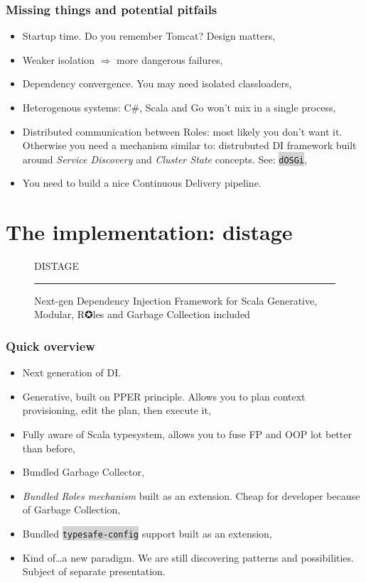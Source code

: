 \documentclass[usenames,dvipsnames]{beamer}
\newcommand{\code}[1]{\colorbox{lightgray}{\texttt{#1}}}
\begin{document}
\begin{frame}
\frametitle{Missing things and potential pitfails}
\begin{itemize}
\item Startup time. Do you remember Tomcat? Design matters\footnotemark[1],
\item Weaker isolation $\Rightarrow$ more dangerous failures,
\item Dependency convergence. You may need isolated classloaders\footnotemark[2],
\item Heterogenous systems: C\#, Scala and Go won't mix in a single process\footnotemark[3], 
\item Distributed communication between Roles: most likely you don't want it. Otherwise 
      you need a mechanism similar to: distrubuted DI framework 
      built around \textit{Service Discovery} and \textit{Cluster State} concepts. See: \code{dOSGi},
\item You need to build a nice Continuous Delivery pipeline.
\end{itemize}
\end{frame}

\section{The implementation: distage}

\begin{frame}
\begin{figure}
\Huge 
\color{RubineRed} DISTAGE
\noindent
{\color{RubineRed} \rule{\linewidth}{1mm} }
\Large Next-gen Dependency Injection Framework for Scala
\normalsize Generative, Modular, R✪les and Garbage Collection included 
\end{figure}
\end{frame}

\begin{frame}
\frametitle{Quick overview}
\begin{itemize}
\item Next generation of DI.
\item Generative, built on PPER principle. Allows you to plan context provisioning, edit the plan, then execute it,
\item Fully aware of Scala typesystem, allows you to fuse FP and OOP lot better than before, 
\item Bundled Garbage Collector,
\item \textit{Bundled Roles mechanism} built as an extension. Cheap for developer because of Garbage Collection,
\item Bundled \code{typesafe-config} support built as an extension,
\item Kind of\dots a new paradigm. We are still discovering patterns and possibilities. Subject of separate presentation.
\end{itemize}
\end{frame}
\end{document}
